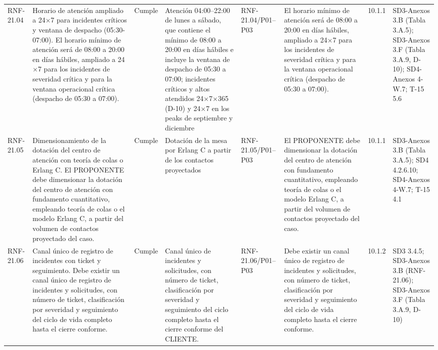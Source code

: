 \documentclass[oficio,firma,final]{lafrox}
\begin{document}
\begin{landscape}
{\begin{longtable}{@{}F{0.054} F{0.173} F{0.061} F{0.191} F{0.106} F{0.180} F{0.067} F{0.168}@{}}
  RNF-21.04 & Horario de atención ampliado a 24$\times$7 para incidentes críticos y ventana de despacho (05:30-07:00). El horario mínimo de atención será de 08:00 a 20:00 en días hábiles, ampliado a 24$\times$7 para los incidentes de severidad crítica y para la ventana operacional crítica (despacho de 05:30 a 07:00). & Cumple & Atención 04:00–22:00 de lunes a sábado, que contiene el mínimo de 08:00 a 20:00 en días hábiles e incluye la ventana de despacho de 05:30 a 07:00; incidentes críticos y altos atendidos 24$\times$7$\times$365 (D-10) y 24$\times$7 en los peaks de septiembre y diciembre & RNF-21.04/\allowbreak{}P01--\allowbreak{}P03 & El horario mínimo de atención será de 08:00 a 20:00 en días hábiles, ampliado a 24$\times$7 para los incidentes de severidad crítica y para la ventana operacional crítica (despacho de 05:30 a 07:00). & 10.1.1 & SD3-Anexos 3.B (Tabla 3.A.5); SD3-Anexos 3.F (Tabla 3.A.9, D-10); SD4-Anexos 4-W.7; T-15 5.6  \\
  RNF-21.05 & Dimensionamiento de la dotación del centro de atención con teoría de colas o Erlang C. El PROPONENTE debe dimensionar la dotación del centro de atención con fundamento cuantitativo, empleando teoría de colas o el modelo Erlang C, a partir del volumen de contactos proyectado del caso. & Cumple & Dotación de la mesa por Erlang C a partir de los contactos proyectados & RNF-21.05/\allowbreak{}P01--\allowbreak{}P03 & El PROPONENTE debe dimensionar la dotación del centro de atención con fundamento cuantitativo, empleando teoría de colas o el modelo Erlang C, a partir del volumen de contactos proyectado del caso. & 10.1.1 & SD3-Anexos 3.B (Tabla 3.A.5); SD4 4.2.6.10; SD4-Anexos 4-W.7; T-15 4.1  \\
  RNF-21.06 & Canal único de registro de incidentes con ticket y seguimiento. Debe existir un canal único de registro de incidentes y solicitudes, con número de ticket, clasificación por severidad y seguimiento del ciclo de vida completo hasta el cierre conforme. & Cumple & Canal único de incidentes y solicitudes, con número de ticket, clasificación por severidad y seguimiento del ciclo completo hasta el cierre conforme del CLIENTE. & RNF-21.06/\allowbreak{}P01--\allowbreak{}P03 & Debe existir un canal único de registro de incidentes y solicitudes, con número de ticket, clasificación por severidad y seguimiento del ciclo de vida completo hasta el cierre conforme. & 10.1.2 & SD3 3.4.5; SD3-Anexos 3.B (RNF-21.06); SD3-Anexos 3.F (Tabla 3.A.9, D-10)  \\

\end{longtable}}
\end{landscape}
\end{document}
